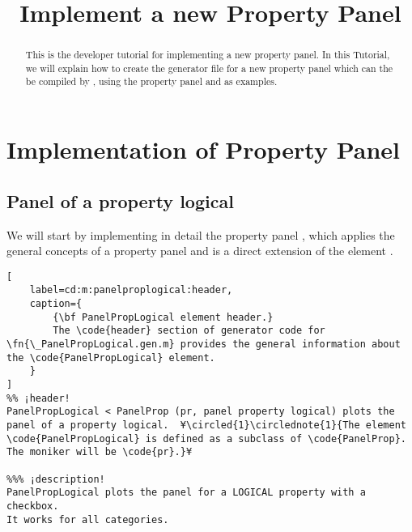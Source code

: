 \documentclass{tufte-handout}
\title{Implement a new Property Panel}
\begin{document}
\maketitle

\begin{abstract}
\noindent
This is the developer tutorial for implementing a new property panel. 
In this Tutorial, we will explain how to create the generator file  for a new property panel which can the be compiled by , using the property panel  and  as examples.
\end{abstract}

\tableofcontents

\clearpage
\section{Implementation of Property Panel}

\subsection{Panel of a property logical}

We will start by implementing in detail the property panel , which applies the general concepts of a property panel and is a direct extension of the element .

\begin{lstlisting}[
	label=cd:m:panelproplogical:header,
	caption={
		{\bf PanelPropLogical element header.}
		The \code{header} section of generator code for \fn{\_PanelPropLogical.gen.m} provides the general information about the \code{PanelPropLogical} element.
	}
]
%% ¡header!
PanelPropLogical < PanelProp (pr, panel property logical) plots the panel of a property logical.  ¥\circled{1}\circlednote{1}{The element \code{PanelPropLogical} is defined as a subclass of \code{PanelProp}. The moniker will be \code{pr}.}¥

%%% ¡description!
PanelPropLogical plots the panel for a LOGICAL property with a checkbox.
It works for all categories.

\end{lstlisting}
\end{document}
